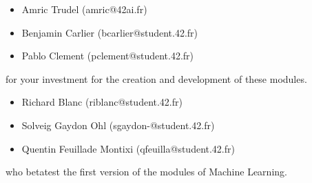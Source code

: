 \documentclass{42-en}
\begin{document}
\begin{itemize}
  \item Amric Trudel (amric@42ai.fr)
  \item Benjamin Carlier (bcarlier@student.42.fr)
  \item Pablo Clement (pclement@student.42.fr)
\end{itemize}
for your investment for the creation and development of these modules.

\begin{itemize}
  \item Richard Blanc (riblanc@student.42.fr)
  \item Solveig Gaydon Ohl (sgaydon-@student.42.fr)
  \item Quentin Feuillade Montixi (qfeuilla@student.42.fr)
\end{itemize}
who betatest the first version of the modules of Machine Learning.
\vfill
\doclicenseThis
\end{document}
